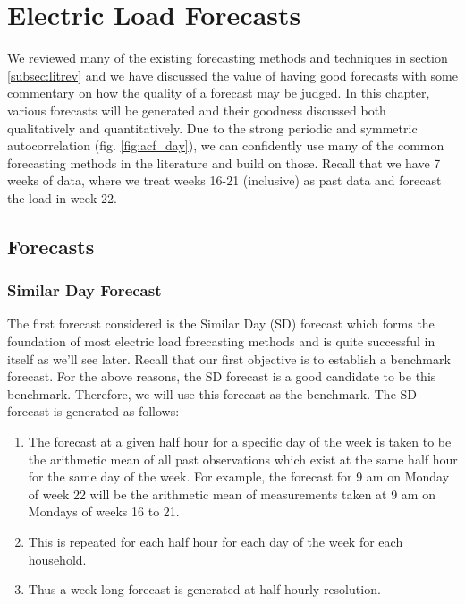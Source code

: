 
\chapter{Electric Load Forecasts}
We reviewed many of the existing forecasting methods and techniques in section \ref{subsec:litrev} and we have discussed the value of having good forecasts with some commentary on how the quality of a forecast may be judged. In this chapter, various forecasts will be generated and their goodness discussed both qualitatively and quantitatively. Due to the strong periodic and symmetric autocorrelation (fig. \ref{fig:acf_day}), we can confidently use many of the common forecasting methods in the literature and build on those. Recall that we have 7 weeks of data, where we treat weeks 16-21 (inclusive) as past data and forecast the load in week 22.

\section{Forecasts} \label{subsec:forecasts}

\subsection{Similar Day Forecast}

The first forecast considered is the Similar Day (SD) forecast which forms the foundation of most electric load forecasting methods and is quite successful in itself as we'll see later. Recall that our first objective is to establish a benchmark forecast. For the above reasons, the SD forecast is a good candidate to be this benchmark. Therefore, we will use this forecast as the benchmark. The SD forecast is generated as follows:
\begin{enumerate}
\item The forecast at a given half hour for a specific day of the week is taken to be the arithmetic mean of all past observations which exist at the same half hour for the same day of the week. For example, the forecast for 9 am on Monday of week 22 will be the arithmetic mean of measurements taken at 9 am on Mondays of weeks 16 to 21.
\item This is repeated for each half hour for each day of the week for each household.
\item Thus a week long forecast is generated at half hourly resolution.
\end{enumerate}


